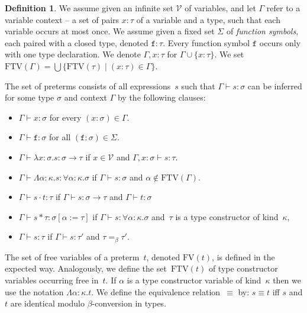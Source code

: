 \documentclass[a4paper,UKenglish,cleveref,autoref,numberwithinsect]{lipics-v2019}
\theoremstyle{definition}
\newtheorem{defn}[theorem]{Definition}
\newcommand{\Vars}{\mathcal{V}}
\newcommand{\arrtype}{\rightarrow}
\newcommand{\quant}[2]{\forall #1.#2}
\newcommand{\app}[2]{#1 \cdot #2}
\newcommand{\tapp}[2]{#1 * #2}
\newcommand{\subst}[2]{#1:=#2}
\newcommand{\abs}[2]{\lambda #1.#2}
\newcommand{\tabs}[2]{\Lambda #1.#2}
\newcommand{\FTV}{\mathrm{FTV}}
\newcommand{\FV}{\mathrm{FV}}
\begin{document}
\begin{defn}\label{def_preterms}
  We assume given an infinite set $\Vars$ of variables, and let
  $\Gamma$ refer to a variable context -- a set of pairs $x : \tau$ of
  a variable and a type, such that each variable occurs at most
  once. We assume given a fixed set $\Sigma$ of \emph{function
    symbols}, each paired with a closed type, denoted $\mathtt{f} :
  \tau$.  Every function symbol $\mathtt{f}$ occurs only with one type
  declaration. We denote $\Gamma,x:\tau$ for $\Gamma \cup \{x:\tau\}$. We
  set $\FTV(\Gamma) = \bigcup\{\FTV(\tau) \mid (x : \tau) \in
  \Gamma\}$.
  \pagebreak

  The set of preterms consists of all expressions~$s$ such that
  $\Gamma \vdash s : \sigma$ can be inferred for some type $\sigma$
  and context $\Gamma$ by the following clauses:
  \begin{itemize}
  \item $\Gamma \vdash x : \sigma$ for every $(x : \sigma) \in \Gamma$.
  \item $\Gamma \vdash \mathtt{f} : \sigma$ for all
    $(\mathtt{f} : \sigma) \in \Sigma$.
  \item $\Gamma \vdash \abs{x:\sigma}{s} : \sigma \arrtype \tau$ if $x
    \in \Vars$ and $\Gamma, x : \sigma \vdash s : \tau$.
  \item $\Gamma \vdash \tabs{\alpha:\kappa}{s} : \quant{\alpha:\kappa}{\sigma}$ if
    $\Gamma \vdash s : \sigma$ and $\alpha \notin \FTV(\Gamma)$.
  \item $\Gamma \vdash \app{s}{t} : \tau$ if $\Gamma \vdash s : \sigma
    \arrtype \tau$ and $\Gamma \vdash t : \sigma$
  \item $\Gamma \vdash \tapp{s}{\tau} : \sigma[\subst{\alpha}{\tau}]$
    if $\Gamma \vdash s : \quant{\alpha:\kappa}{\sigma}$ and~$\tau$ is
    a type constructor of kind~$\kappa$,
  \item $\Gamma \vdash s : \tau$ if $\Gamma \vdash s : \tau'$ and
    $\tau =_\beta \tau'$.
  \end{itemize}
  The set of free variables of a preterm~$t$, denoted $\FV(t)$, is
  defined in the expected way. Analogously, we define the
  set~$\FTV(t)$ of type constructor variables occurring free
  in~$t$.
  If $\alpha$ is a type constructor variable of
  kind~$\kappa$ then we use the notation $\tabs{\alpha:\kappa}{t}$.
  We define the equivalence relation~$\equiv$ by: $s \equiv t$ iff $s$
  and $t$ are identical modulo $\beta$-conversion in types.
\end{defn}
\end{document}
